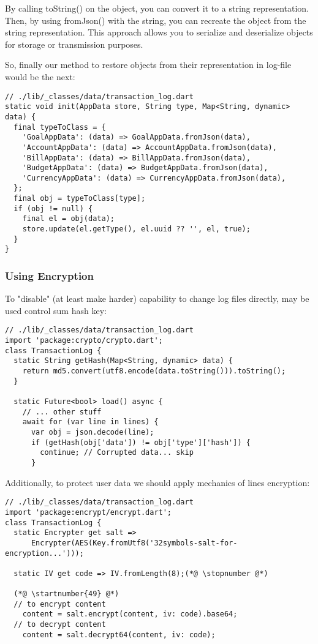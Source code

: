 By calling toString() on the object, you can convert it to a string representation. Then, by using fromJson() with the 
string, you can recreate the object from the string representation. This approach allows you to serialize and 
deserialize objects for storage or transmission purposes.

So, finally our method to restore objects from their representation in log-file would be the next:

\begin{lstlisting}[firstnumber=54]
// ./lib/_classes/data/transaction_log.dart
static void init(AppData store, String type, Map<String, dynamic> data) {
  final typeToClass = {
    'GoalAppData': (data) => GoalAppData.fromJson(data),
    'AccountAppData': (data) => AccountAppData.fromJson(data),
    'BillAppData': (data) => BillAppData.fromJson(data),
    'BudgetAppData': (data) => BudgetAppData.fromJson(data),
    'CurrencyAppData': (data) => CurrencyAppData.fromJson(data),
  };
  final obj = typeToClass[type];
  if (obj != null) {
    final el = obj(data);
    store.update(el.getType(), el.uuid ?? '', el, true);
  }
}
\end{lstlisting}



\subsubsection{Using Encryption}

To "disable" (at least make harder) capability to change log files directly, may be used control sum hash key:

\begin{lstlisting}
// ./lib/_classes/data/transaction_log.dart
import 'package:crypto/crypto.dart';
class TransactionLog {
  static String getHash(Map<String, dynamic> data) {
    return md5.convert(utf8.encode(data.toString())).toString();
  }

  static Future<bool> load() async {
    // ... other stuff
    await for (var line in lines) {
      var obj = json.decode(line);
      if (getHash(obj['data']) != obj['type']['hash']) {
        continue; // Corrupted data... skip
      }
\end{lstlisting}

Additionally, to protect user data we should apply mechanics of lines encryption:

\begin{lstlisting}
// ./lib/_classes/data/transaction_log.dart
import 'package:encrypt/encrypt.dart';
class TransactionLog {
  static Encrypter get salt =>
      Encrypter(AES(Key.fromUtf8('32symbols-salt-for-encryption...')));

  static IV get code => IV.fromLength(8);(*@ \stopnumber @*)

  (*@ \startnumber{49} @*)
  // to encrypt content
    content = salt.encrypt(content, iv: code).base64;
  // to decrypt content
    content = salt.decrypt64(content, iv: code);
\end{lstlisting}
